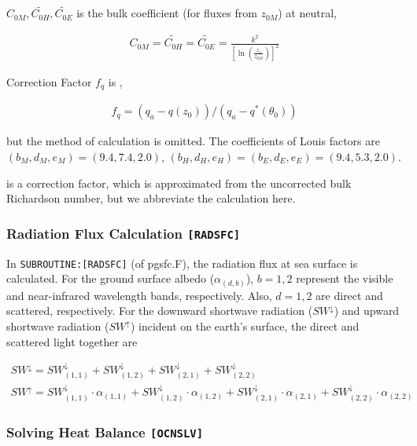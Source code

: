 \(C_{0M}, \widetilde{C_{0H}}, \widetilde{C_{0E}}\) is the bulk
coefficient (for fluxes from \(z_{0M}\)) at neutral,

\begin{eqnarray}
    C_{0M}  =  \widetilde{C_{0H}}  =  \widetilde{C_{0E}}  =
       \frac{k^2}{\left[\ln \left(\frac{z_1}{z_{0M}}\right)\right]^2 }
\end{eqnarray}

Correction Factor \(f_q\) is ,

\begin{eqnarray}
  f_q = (q_a - q(z_0))/(q_a - q^{\ast}(\theta_0))
\end{eqnarray}

but the method of calculation is omitted. The coefficients of Louis
factors are \(( b_M, d_M, e_M ) = ( 9.4, 7.4, 2.0 )\),
\(( b_H, d_H, e_H ) = ( b_E, d_E, e_E ) = ( 9.4, 5.3, 2.0 )\).

is a correction factor, which is approximated from the uncorrected bulk
Richardson number, but we abbreviate the calculation here.

\hypertarget{radiation-flux-calculation-radsfc}{%
\subsubsection{\texorpdfstring{Radiation Flux Calculation
\texttt{{[}RADSFC{]}}}{Radiation Flux Calculation {[}RADSFC{]}}}\label{radiation-flux-calculation-radsfc}}

In \texttt{SUBROUTINE:{[}RADSFC{]}} (of pgsfc.F), the radiation flux at
sea surface is calculated. For the ground surface albedo
(\(\alpha_{(d,b)}\)), \(b=1,2\) represent the visible and near-infrared
wavelength bands, respectively. Also, \(d=1,2\) are direct and
scattered, respectively. For the downward shortwave radiation
(\(SW^\downarrow\)) and upward shortwave radiation (\(SW^\uparrow\))
incident on the earth's surface, the direct and scattered light together
are

\begin{eqnarray}
    SW^\downarrow = SW^\downarrow_{(1,1)}+SW^\downarrow_{(1,2)}+SW^\downarrow_{(2,1)}+SW^\downarrow_{(2,2)} \\
SW^\uparrow = SW^\downarrow_{(1,1)}\cdot\alpha_{(1,1)}+SW^\downarrow_{(1,2)}\cdot\alpha_{(1,2)}+SW^\downarrow_{(2,1)}\cdot\alpha_{(2,1)}+SW^\downarrow_{(2,2)}\cdot\alpha_{(2,2)}
\end{eqnarray}

\hypertarget{solving-heat-balance-ocnslv}{%
\subsubsection{\texorpdfstring{Solving Heat Balance
\texttt{{[}OCNSLV{]}}}{Solving Heat Balance {[}OCNSLV{]}}}\label{solving-heat-balance-ocnslv}}

